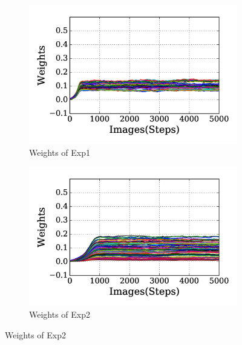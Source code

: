 \begin{figure}
	\centering
	\DIFdelbeginFL %
\DIFdelendFL \DIFaddbeginFL \begin{subfigure}[t]{0.48\textwidth}
		\DIFaddendFL \includegraphics[width=\textwidth]{pics_sdlm/31_exp_RBM_noise/exp1_weights_s.png}
		\caption{Weights of Exp1}
	\end{subfigure}
	\DIFdelbeginFL %
\DIFdelendFL \DIFaddbeginFL \begin{subfigure}[t]{0.48\textwidth}
		\DIFaddendFL \includegraphics[width=\textwidth]{pics_sdlm/31_exp_RBM_noise/exp2_weights_s.png}
		\caption{Weights of Exp2}
	\end{subfigure}
	\DIFdelbeginFL %

\end{figure}
